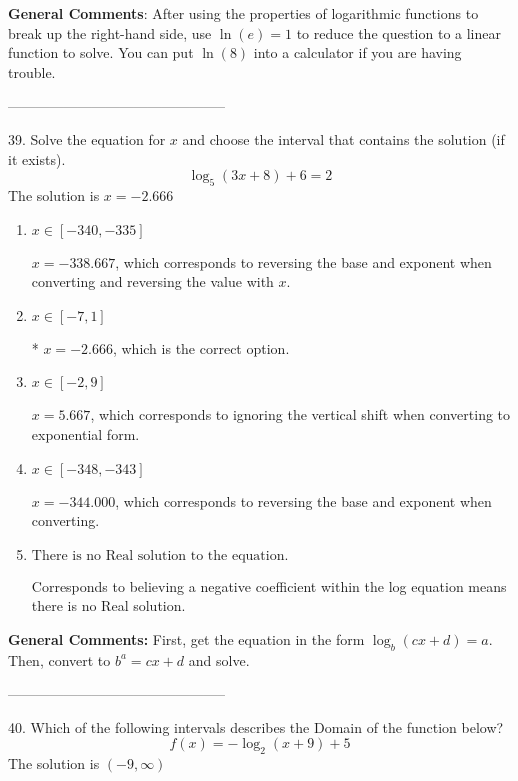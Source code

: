 \documentclass{extbook}[14pt]
\begin{document}
\textbf{General Comments}: After using the properties of logarithmic functions to break up the right-hand side, use $\ln(e) = 1$ to reduce the question to a linear function to solve. You can put $\ln(8)$ into a calculator if you are having trouble.

-----------------------------------------------

39. Solve the equation for $x$ and choose the interval that contains the solution (if it exists).
\[ \log_{5}{(3x+8)}+6 = 2 \] 
The solution is $ x = -2.666 $ 

\begin{enumerate}[label=\Alph*.] 
\item $ x \in [-340, -335] $ 

 $x = -338.667$, which corresponds to reversing the base and exponent when converting and reversing the value with $x$. 
\item $ x \in [-7, 1] $ 

 * $x = -2.666$, which is the correct option. 
\item $ x \in [-2, 9] $ 

 $x = 5.667$, which corresponds to ignoring the vertical shift when converting to exponential form. 
\item $ x \in [-348, -343] $ 

 $x = -344.000$, which corresponds to reversing the base and exponent when converting. 
\item $ \text{There is no Real solution to the equation.} $ 

 Corresponds to believing a negative coefficient within the log equation means there is no Real solution. 
\end{enumerate} 
 
\textbf{General Comments:} First, get the equation in the form $\log_b{(cx+d)} = a$. Then, convert to $b^a = cx+d$ and solve.

-----------------------------------------------

40. Which of the following intervals describes the Domain of the function below?
\[ f(x) = -\log_2{(x+9)}+5 \] 
The solution is $ (-9, \infty) $ 
\end{document}
